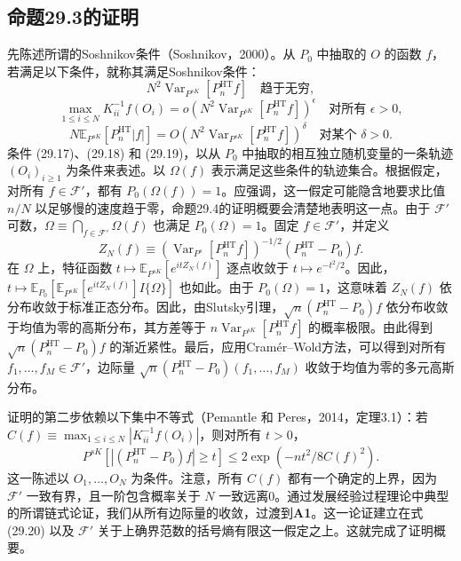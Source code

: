 \subsection{命题29.3的证明}

先陈述所谓的Soshnikov条件（Soshnikov，2000）。从 $P_0$ 中抽取的 $O$ 的函数 $f$，若满足以下条件，就称其满足Soshnikov条件：
\begin{equation}
N^2\operatorname{Var}_{P^{sK}}\!\left[P_n^{\mathrm{HT}}f\right]
\quad\text{趋于无穷},
\tag{29.17}
\end{equation}
\begin{equation}
\max_{1\le i\le N}K_{ii}^{-1}f(O_i)
=o\!\left(N^2\operatorname{Var}_{P^{sK}}\!\left[P_n^{\mathrm{HT}}f\right]\right)^\epsilon
\quad\text{对所有 }\epsilon>0,
\tag{29.18}
\end{equation}
\begin{equation}
N\mathbb E_{P^{sK}}\!\left[P_n^{\mathrm{HT}}|f|\right]
=O\!\left(N^2\operatorname{Var}_{P^{sK}}\!\left[P_n^{\mathrm{HT}}f\right]\right)^\delta
\quad\text{对某个 }\delta>0.
\tag{29.19}
\end{equation}
条件 (29.17)、(29.18) 和 (29.19)，以从 $P_0$ 中抽取的相互独立随机变量的一条轨迹 $(O_i)_{i\ge1}$ 为条件来表述。以 $\Omega(f)$ 表示满足这些条件的轨迹集合。根据假定，对所有 $f\in\mathcal F'$，都有 $P_0(\Omega(f))=1$。应强调，这一假定可能隐含地要求比值 $n/N$ 以足够慢的速度趋于零，命题29.4的证明概要会清楚地表明这一点。由于 $\mathcal F'$ 可数，$\Omega\equiv\bigcap_{f\in\mathcal F'}\Omega(f)$ 也满足 $P_0(\Omega)=1$。固定 $f\in\mathcal F'$，并定义
\[
Z_N(f)\equiv
\left(\operatorname{Var}_{P^s}\!\left[P_n^{\mathrm{HT}}f\right]\right)^{-1/2}
(P_n^{\mathrm{HT}}-P_0)f.
\]
在 $\Omega$ 上，特征函数 $t\mapsto\mathbb E_{P^{sK}}[e^{itZ_N(f)}]$ 逐点收敛于 $t\mapsto e^{-t^2/2}$。因此，$t\mapsto\mathbb E_{P_0}[\mathbb E_{P^{sK}}[e^{itZ_N(f)}]I\{\Omega\}]$ 也如此。由于 $P_0(\Omega)=1$，这意味着 $Z_N(f)$ 依分布收敛于标准正态分布。因此，由Slutsky引理，$\sqrt n(P_n^{\mathrm{HT}}-P_0)f$ 依分布收敛于均值为零的高斯分布，其方差等于 $n\operatorname{Var}_{P^{sK}}[P_n^{\mathrm{HT}}f]$ 的概率极限。由此得到 $\sqrt n(P_n^{\mathrm{HT}}-P_0)f$ 的渐近紧性。最后，应用Cramér--Wold方法，可以得到对所有 $f_1,\ldots,f_M\in\mathcal F'$，边际量 $\sqrt n(P_n^{\mathrm{HT}}-P_0)(f_1,\ldots,f_M)$ 收敛于均值为零的多元高斯分布。

证明的第二步依赖以下集中不等式（Pemantle 和 Peres，2014，定理3.1）：若 $C(f)\equiv\max_{1\le i\le N}|K_{ii}^{-1}f(O_i)|$，则对所有 $t>0$，
\begin{equation}
P^{sK}\!\left[|(P_n^{\mathrm{HT}}-P_0)f|\ge t\right]
\le2\exp\left(-nt^2/8C(f)^2\right).
\tag{29.20}
\end{equation}
这一陈述以 $O_1,\ldots,O_N$ 为条件。注意，所有 $C(f)$ 都有一个确定的上界，因为 $\mathcal F'$ 一致有界，且一阶包含概率关于 $N$ 一致远离0。通过发展经验过程理论中典型的所谓链式论证，我们从所有边际量的收敛，过渡到\textbf{A1}。这一论证建立在式 (29.20) 以及 $\mathcal F'$ 关于上确界范数的括号熵有限这一假定之上。这就完成了证明概要。
